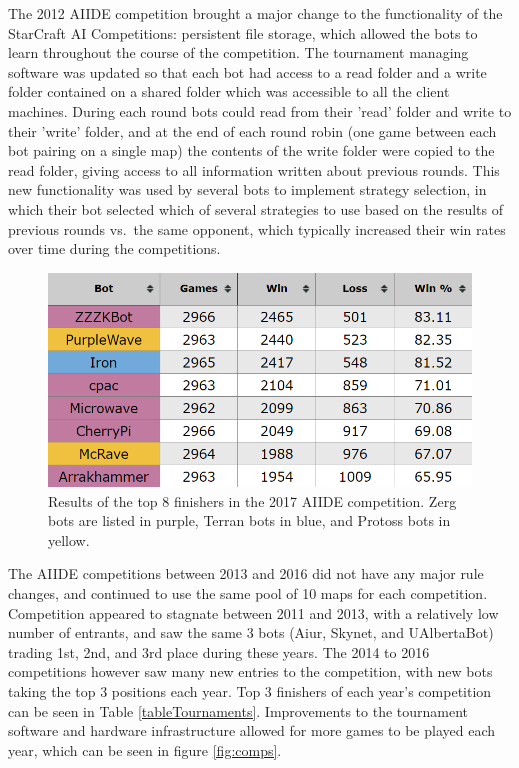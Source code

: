 The 2012 AIIDE competition brought a major change to the functionality of the StarCraft AI Competitions: persistent file storage, which allowed the bots to learn throughout the course of the competition. The tournament managing software was updated so that each bot had access to a read folder and a write folder contained on a shared folder which was accessible to all the client machines. During each round bots could read from their 'read' folder and write to their 'write' folder, and at the end of each round robin (one game between each bot pairing on a single map) the contents of the write folder were copied to the read folder, giving access to all information written about previous rounds. This new functionality was used by several bots to implement strategy selection, in which their bot selected which of several strategies to use based on the results of previous rounds vs.\ the same opponent, which typically increased their win rates over time during the competitions.

\begin{figure}[t]
  \centering
  \includegraphics[width=1\columnwidth]{fig/aiide2017.png}
  \caption{Results of the top 8 finishers in the 2017 AIIDE competition. Zerg bots are listed in purple, Terran bots in blue, and Protoss bots in yellow.}
  \label{figAIIDEresults}
\end{figure}

The AIIDE competitions between 2013 and 2016 did not have any major rule changes, and continued to use the same pool of 10 maps for each competition. Competition appeared to stagnate between 2011 and 2013, with a relatively low number of entrants, and saw the same 3 bots (Aiur, Skynet, and UAlbertaBot) trading 1st, 2nd, and 3rd place during these years. The 2014 to 2016 competitions however saw many new entries to the competition, with new bots taking the top 3 positions each year. Top 3 finishers of each year's competition can be seen in Table \ref{tableTournaments}. Improvements to the tournament software and hardware infrastructure allowed for more games to be played each year, which can be seen in figure \ref{fig:comps}.

